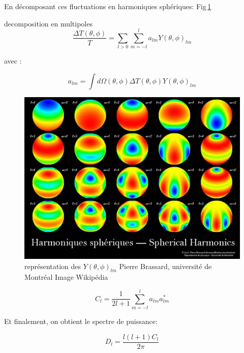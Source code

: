 En décomposant ces fluctuations en harmoniques sphériques:
Fig\,\ref{fig:harmoniques_spheriques}

decomposition en multipoles
\begin{equation}
 \frac{\Delta T(\theta,\phi)}{T} = \sum_{l>0} \sum_{m=-l}^l a_{lm} Y(\theta,\phi)_{lm}
\end{equation}

avec : 

\begin{equation}
a_{lm}= \int d\Omega(\theta,\phi) \Delta T (\theta,\phi) Y(\theta,\phi)_{lm}
\end{equation}

\begin{figure}[bth]
        \includegraphics[width=.95\linewidth]{img/01/harmoniques_spheriques.jpeg} 
        \caption{
        représentation des $Y(\theta,\phi)_{lm}$
 Pierre Brassard, université de Montréal 
        Image Wikipédia}
 		\label{fig:harmoniques_spheriques}
\end{figure}


\begin{equation}
C_l = \frac{1}{2l+1} \sum_{m=-l}^l a_{lm} a_{lm}^*
\end{equation}


Et finalement, on obtient le spectre de puissance:

\begin{equation}
D_l = \frac{l (l+1) C_l }{2 \pi} 
\end{equation}

